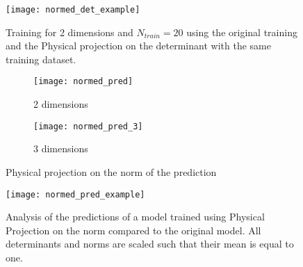 \begin{figure}[ht]
	\centering
	\texttt{[image: normed\_det\_example]}
	\caption{Training for 2 dimensions and $N_{train} = 20$ using the original training and the Physical projection on the determinant with the same training dataset.}
	\label{fig:normed_det_example}
\end{figure}

\begin{figure}
	\centering
	\begin{subfigure}{.5\textwidth}
		\centering
		\texttt{[image: normed\_pred]}
		\caption{2 dimensions}
	\end{subfigure}%
	\begin{subfigure}{.5\textwidth}
		\centering
		\texttt{[image: normed\_pred\_3]}
		\caption{3 dimensions}
	\end{subfigure}
	\caption{Physical projection on the norm of the prediction}
	\label{fig:normed_pred}
\end{figure}

\begin{figure}[ht]
	\centering
	\texttt{[image: normed\_pred\_example]}
	\caption{Analysis of the predictions of a model trained using Physical Projection on the norm compared to the original model. All determinants and norms are scaled such that their mean is equal to one.}
	\label{fig:normed_pred_example}
\end{figure}








\clearpage
